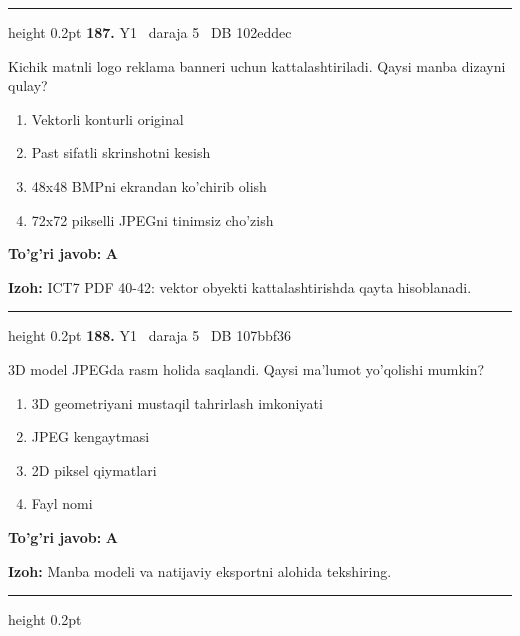 \documentclass[10pt,a4paper,oneside]{article}
\begin{document}
\vspace{2mm}\hrule height 0.2pt \vspace{4mm}
\hypertarget{q187}{\textbf{\color{ink}187.}}  {\color{muted}\scriptsize Y1 \textbullet\ daraja 5 \textbullet\ DB 102eddec}
\par
Kichik matnli logo reklama banneri uchun kattalashtiriladi. Qaysi manba dizayni qulay?
\begin{enumerate}[label=\Alph*),leftmargin=9mm]
\item Vektorli konturli original
\item Past sifatli skrinshotni kesish
\item 48x48 BMPni ekrandan ko'chirib olish
\item 72x72 pikselli JPEGni tinimsiz cho'zish
\end{enumerate}
\begin{tcolorbox}[enhanced,breakable,colback=teal!4,colframe=teal!45!black,boxrule=0.45pt,arc=1.2mm,left=2.8mm,right=2.8mm,top=2mm,bottom=2mm,before skip=2mm,after skip=2mm]
\textbf{\color{teal}To'g'ri javob:} \textbf{A}
\par\smallskip
\textbf{Izoh:} ICT7 PDF 40-42: vektor obyekti kattalashtirishda qayta hisoblanadi.
\end{tcolorbox}
\vspace{2mm}\hrule height 0.2pt \vspace{4mm}
\hypertarget{q188}{\textbf{\color{ink}188.}}  {\color{muted}\scriptsize Y1 \textbullet\ daraja 5 \textbullet\ DB 107bbf36}
\par
3D model JPEGda rasm holida saqlandi. Qaysi ma'lumot yo'qolishi mumkin?
\begin{enumerate}[label=\Alph*),leftmargin=9mm]
\item 3D geometriyani mustaqil tahrirlash imkoniyati
\item JPEG kengaytmasi
\item 2D piksel qiymatlari
\item Fayl nomi
\end{enumerate}
\begin{tcolorbox}[enhanced,breakable,colback=teal!4,colframe=teal!45!black,boxrule=0.45pt,arc=1.2mm,left=2.8mm,right=2.8mm,top=2mm,bottom=2mm,before skip=2mm,after skip=2mm]
\textbf{\color{teal}To'g'ri javob:} \textbf{A}
\par\smallskip
\textbf{Izoh:} Manba modeli va natijaviy eksportni alohida tekshiring.
\end{tcolorbox}
\vspace{2mm}\hrule height 0.2pt \vspace{4mm}
\end{document}
